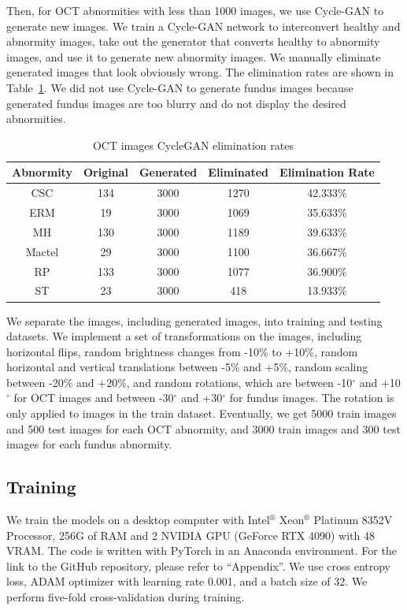 \documentclass{article}
\begin{document}
	Then, for OCT abnormities with less than 1000 images, we use Cycle-GAN to generate new images. We train a Cycle-GAN network to interconvert healthy and abnormity images, take out the generator that converts healthy to abnormity images, and use it to generate new abnormity images. We manually eliminate generated images that look obviously wrong. The elimination rates are shown in Table~\ref{tb:cycleGAN_number}. We did not use Cycle-GAN to generate fundus images because generated fundus images are too blurry and do not display the desired abnormities.
	
	{
		\fontsize{9}{12}\selectfont
		{
			\begin{longtable}{ccccc}
				\caption{OCT images CycleGAN elimination rates}
				\label{tb:cycleGAN_number}\\
				\toprule
				Abnormity&Original&Generated&Eliminated&Elimination Rate\\
				\midrule
				CSC   &134&3000&1270&42.333\% \\
				ERM   &19 &3000&1069&35.633\% \\
				MH    &130&3000&1189&39.633\% \\
				Mactel&29 &3000&1100&36.667\% \\
				RP    &133&3000&1077&36.900\% \\
				ST    &23 &3000&418 &13.933\% \\
				\bottomrule
			\end{longtable}
		}
	}
	
	We separate the images, including generated images, into training and testing datasets. We implement a set of transformations on the images, including horizontal flips, random brightness changes from -10\% to +10\%, random horizontal and vertical translations between -5\% and +5\%, random scaling between -20\% and +20\%, and random rotations, which are between -10$^\circ$ and +10$^\circ$ for OCT images and between -30$^\circ$ and +30$^\circ$ for fundus images. The rotation is only applied to images in the train dataset. Eventually, we get 5000 train images and 500 test images for each OCT abnormity, and 3000 train images and 300 test images for each fundus abnormity.
	
	\subsection{Training}
	
	We train the models on a desktop computer with Intel$^®$ Xeon$^®$ Platinum 8352V Processor, 256G of RAM and 2 NVIDIA GPU (GeForce RTX 4090) with 48 VRAM. The code is written with PyTorch in an Anaconda environment. For the link to the GitHub repository, please refer to ``Appendix''. We use cross entropy loss, ADAM optimizer with learning rate 0.001, and a batch size of 32. We perform five-fold cross-validation during training. 
	
\end{document}

